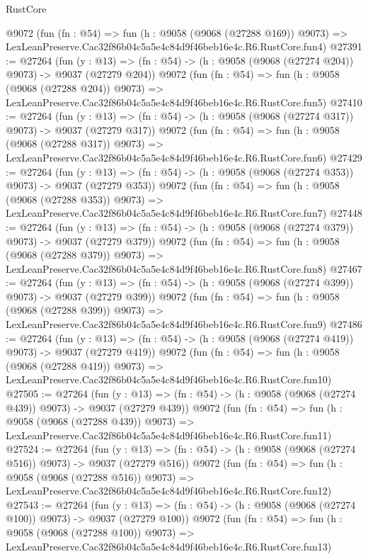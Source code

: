 \begin{lexlean}{RustCore}
\begin{coremodule}
    @9072
    (fun (fn : @54) =>
    fun (h : @9058 (@9068 (@27288 @169)) @9073) =>
    LexLeanPreserve.Cac32f86b04c5a5e4c84d9f46beb16e4c.R6.RustCore.fun4)
@27391 := @27264
    (fun (y : @13) => (fn : @54) -> (h : @9058 (@9068 (@27274 @204)) @9073) -> @9037 (@27279 @204))
    @9072
    (fun (fn : @54) =>
    fun (h : @9058 (@9068 (@27288 @204)) @9073) =>
    LexLeanPreserve.Cac32f86b04c5a5e4c84d9f46beb16e4c.R6.RustCore.fun5)
@27410 := @27264
    (fun (y : @13) => (fn : @54) -> (h : @9058 (@9068 (@27274 @317)) @9073) -> @9037 (@27279 @317))
    @9072
    (fun (fn : @54) =>
    fun (h : @9058 (@9068 (@27288 @317)) @9073) =>
    LexLeanPreserve.Cac32f86b04c5a5e4c84d9f46beb16e4c.R6.RustCore.fun6)
@27429 := @27264
    (fun (y : @13) => (fn : @54) -> (h : @9058 (@9068 (@27274 @353)) @9073) -> @9037 (@27279 @353))
    @9072
    (fun (fn : @54) =>
    fun (h : @9058 (@9068 (@27288 @353)) @9073) =>
    LexLeanPreserve.Cac32f86b04c5a5e4c84d9f46beb16e4c.R6.RustCore.fun7)
@27448 := @27264
    (fun (y : @13) => (fn : @54) -> (h : @9058 (@9068 (@27274 @379)) @9073) -> @9037 (@27279 @379))
    @9072
    (fun (fn : @54) =>
    fun (h : @9058 (@9068 (@27288 @379)) @9073) =>
    LexLeanPreserve.Cac32f86b04c5a5e4c84d9f46beb16e4c.R6.RustCore.fun8)
@27467 := @27264
    (fun (y : @13) => (fn : @54) -> (h : @9058 (@9068 (@27274 @399)) @9073) -> @9037 (@27279 @399))
    @9072
    (fun (fn : @54) =>
    fun (h : @9058 (@9068 (@27288 @399)) @9073) =>
    LexLeanPreserve.Cac32f86b04c5a5e4c84d9f46beb16e4c.R6.RustCore.fun9)
@27486 := @27264
    (fun (y : @13) => (fn : @54) -> (h : @9058 (@9068 (@27274 @419)) @9073) -> @9037 (@27279 @419))
    @9072
    (fun (fn : @54) =>
    fun (h : @9058 (@9068 (@27288 @419)) @9073) =>
    LexLeanPreserve.Cac32f86b04c5a5e4c84d9f46beb16e4c.R6.RustCore.fun10)
@27505 := @27264
    (fun (y : @13) => (fn : @54) -> (h : @9058 (@9068 (@27274 @439)) @9073) -> @9037 (@27279 @439))
    @9072
    (fun (fn : @54) =>
    fun (h : @9058 (@9068 (@27288 @439)) @9073) =>
    LexLeanPreserve.Cac32f86b04c5a5e4c84d9f46beb16e4c.R6.RustCore.fun11)
@27524 := @27264
    (fun (y : @13) => (fn : @54) -> (h : @9058 (@9068 (@27274 @516)) @9073) -> @9037 (@27279 @516))
    @9072
    (fun (fn : @54) =>
    fun (h : @9058 (@9068 (@27288 @516)) @9073) =>
    LexLeanPreserve.Cac32f86b04c5a5e4c84d9f46beb16e4c.R6.RustCore.fun12)
@27543 := @27264
    (fun (y : @13) => (fn : @54) -> (h : @9058 (@9068 (@27274 @100)) @9073) -> @9037 (@27279 @100))
    @9072
    (fun (fn : @54) =>
    fun (h : @9058 (@9068 (@27288 @100)) @9073) =>
    LexLeanPreserve.Cac32f86b04c5a5e4c84d9f46beb16e4c.R6.RustCore.fun13)

\end{coremodule}
\end{lexlean}
